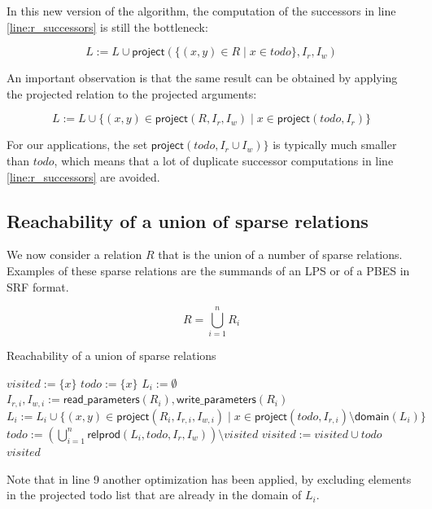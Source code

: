 \documentclass{article}
\newcommand{\var}[1]{\ensuremath{\textit{#1}}}
\begin{document}
\noindent
In this new version of the algorithm, the computation of the successors in line \ref{line:r_successors} is still the bottleneck:

\[
L := L \cup \textsf{project}(\{ (x,y) \in R \mid x \in \var{todo} \}, I_r, I_w)
\]

\noindent
An important observation is that the same result can be obtained by applying the projected relation to the projected arguments:

\[
L := L \cup \{ (x,y) \in \textsf{project}(R, I_r, I_w) \mid x \in \textsf{project}(\var{todo}, I_r) \}
\]

\noindent
For our applications, the set $\textsf{project}(\var{todo}, I_r \cup I_w) \}$ is typically much smaller than $\var{todo}$, which means that a lot of duplicate successor computations in line \ref{line:r_successors} are avoided.

\newpage
\subsection{Reachability of a union of sparse relations}

We now consider a relation $R$ that is the union of a number of sparse relations. Examples of these sparse relations are the summands of an LPS or of a PBES in SRF format.

\[
R = \bigcup_{i=1}^{n} R_i
\]

\begin{algorithm}[h]
\caption{Reachability of a union of sparse relations}
\label{alg:reachability3}
\begin{algorithmic}[1]
\State $\var{visited} := \{ x \}$
\State $\var{todo} := \{ x \}$
    \State $L_i := \emptyset$
    \State $I_{r,i}, I_{w,i} := \textsf{read\_parameters}(R_i), \textsf{write\_parameters}(R_i)$
\EndFor
\While {$\var{todo} \neq \emptyset$}
        \State $L_i := L_i \cup \{ (x,y) \in \textsf{project}(R_i, I_{r,i}, I_{w,i}) \mid x \in \textsf{project}(\var{todo}, I_{r,i})  \setminus \textsf{domain}(L_i) \}$
    \EndFor
    \State $\var{todo} := \left( \bigcup\limits_{i=1}^n \textsf{relprod}(L_i, \var{todo}, I_r, I_w) \right) \setminus \var{visited}$
    \State $\var{visited} := \var{visited} \cup \var{todo}$
\EndWhile
\State \Return \var{visited}
\EndFunction
\end{algorithmic}
\end{algorithm}
\noindent
Note that in line 9 another optimization has been applied, by excluding elements in the projected todo list that are already in the domain of $L_i$.
\end{document}
